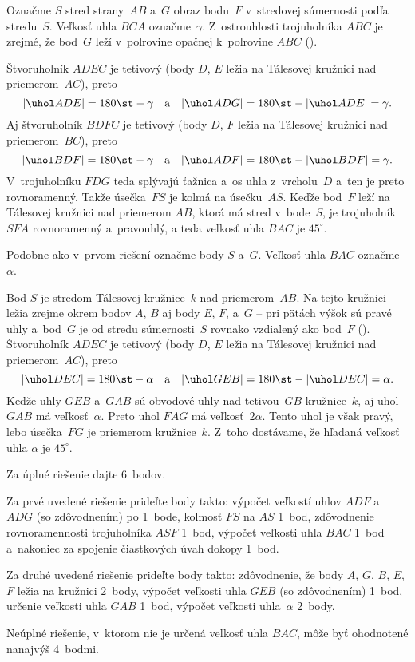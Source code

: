 {%
Označme $S$ stred strany~$AB$ a~$G$ obraz bodu~$F$ v~stredovej
súmernosti podľa stredu~$S$. Veľkosť uhla $BCA$ označme~$\gamma$. Z~ostrouhlosti trojuholníka $ABC$ je zrejmé, že bod~$G$ leží v~polrovine opačnej k~polrovine $ABC$ (\obr).

Štvoruholník $ADEC$ je tetivový (body $D$, $E$ ležia na Tálesovej kružnici nad priemerom~$AC$), preto
$$
|\uhol ADE|=180\st-\gamma\quad\text{a}\quad|\uhol ADG|=180\st-|\uhol ADE|=\gamma.
$$
Aj štvoruholník $BDFC$ je tetivový (body $D$, $F$ ležia na Tálesovej kružnici nad priemerom~$BC$), preto
$$
|\uhol BDF|=180\st-\gamma\quad\text{a}\quad|\uhol ADF|=180\st-|\uhol BDF|=\gamma.
$$
V~trojuholníku $FDG$ teda splývajú ťažnica a~os uhla z~vrcholu~$D$ a~ten je preto rovnoramenný. Takže úsečka~$FS$ je kolmá na úsečku~$AS$. Keďže bod~$F$ leží na Tálesovej kružnici nad priemerom $AB$, ktorá má
stred v~bode~$S$, je trojuholník $SFA$ rovnoramenný a~pravouhlý, a teda veľkosť uhla $BAC$ je $45^\circ$.

\ineriesenie
Podobne ako v~prvom riešení označme  body $S$ a~$G$. Veľkosť uhla $BAC$ označme~$\alpha$.

Bod $S$ je stredom Tálesovej kružnice~$k$ nad priemerom~$AB$. Na tejto kružnici ležia zrejme okrem bodov $A$, $B$ aj body $E$, $F$, a~$G$ -- pri pätách výšok sú pravé uhly a~bod~$G$ je od stredu súmernosti~$S$ rovnako vzdialený
ako bod~$F$ (\obr). Štvoruholník $ADEC$ je tetivový (body $D$, $E$ ležia na Tálesovej kružnici nad priemerom~$AC$), preto
$$
|\uhol DEC|=180\st-\alpha\quad\text{a}\quad|\uhol GEB|=180\st-|\uhol DEC|=\alpha.
$$
Keďže uhly $GEB$ a~$GAB$ sú obvodové uhly nad tetivou~$GB$ kružnice~$k$, aj uhol $GAB$ má veľkosť~$\alpha$. Preto uhol $FAG$ má veľkosť~$2\alpha$. Tento uhol je
však pravý, lebo úsečka~$FG$ je priemerom kružnice~$k$. Z~toho dostávame, že hľadaná veľkosť uhla $\alpha$ je $45^\circ$.

\nobreak\medskip\petit\noindent
Za úplné riešenie dajte 6~bodov.

Za prvé uvedené riešenie prideľte body takto: výpočet veľkostí uhlov
$ADF$ a~$ADG$ (so zdôvodnením) po 1~bode, kolmosť $FS$ na $AS$ 1~bod,
zdôvodnenie rovnoramennosti trojuholníka $ASF$ 1~bod, výpočet veľkosti
uhla $BAC$ 1~bod a~nakoniec za spojenie čiastkových úvah dokopy 1~bod.

Za druhé uvedené riešenie prideľte body takto: zdôvodnenie, že body
$A$, $G$, $B$, $E$, $F$ ležia na kružnici 2~body, výpočet veľkosti
uhla $GEB$ (so zdôvodnením) 1~bod, určenie veľkosti uhla $GAB$ 1~bod,
výpočet veľkosti uhla~$\alpha$ 2~body.

Neúplné riešenie, v~ktorom nie je určená veľkosť uhla $BAC$, môže byť
ohodnotené nanajvýš 4~bodmi.

\endpetit
\bigbreak}


